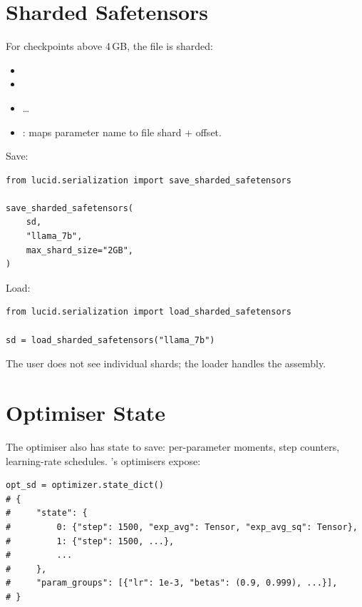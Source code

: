 \section{Sharded Safetensors}
\label{sec:serialization:sharded}

For checkpoints above 4\,GB, the file is sharded:

\begin{itemize}
  \item {}
  \item {}
  \item \dots
  \item {}: maps
    parameter name to file shard + offset.
\end{itemize}

Save:

\begin{lstlisting}[style=lucid,language=LucidPython]
from lucid.serialization import save_sharded_safetensors

save_sharded_safetensors(
    sd,
    "llama_7b",
    max_shard_size="2GB",
)
\end{lstlisting}

Load:

\begin{lstlisting}[style=lucid,language=LucidPython]
from lucid.serialization import load_sharded_safetensors

sd = load_sharded_safetensors("llama_7b")
\end{lstlisting}

The user does not see individual shards; the loader handles
the assembly.

\section{Optimiser State}
\label{sec:serialization:optimizer_state}

The optimiser also has state to save: per-parameter moments,
step counters, learning-rate schedules. \Lucid's optimisers
expose:

\begin{lstlisting}[style=lucid,language=LucidPython]
opt_sd = optimizer.state_dict()
# {
#     "state": {
#         0: {"step": 1500, "exp_avg": Tensor, "exp_avg_sq": Tensor},
#         1: {"step": 1500, ...},
#         ...
#     },
#     "param_groups": [{"lr": 1e-3, "betas": (0.9, 0.999), ...}],
# }
\end{lstlisting}

